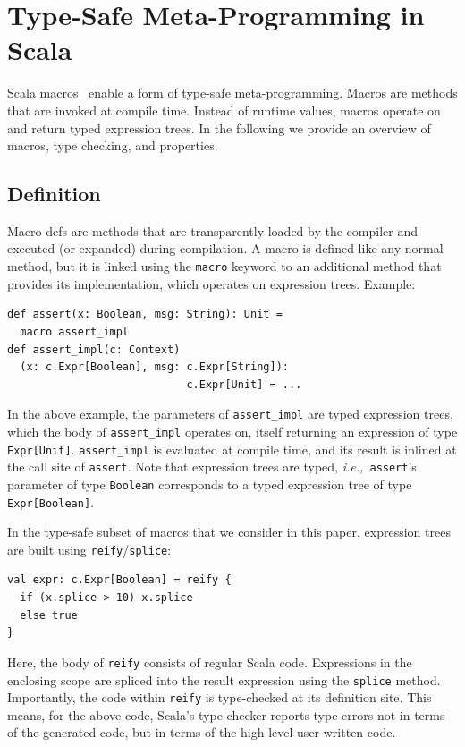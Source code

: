 \documentclass[preprint,nocopyrightspace]{sigplanconf}
\newcommand{\ie}{{\em i.e.,~}}
\begin{document}
\section{Type-Safe Meta-Programming in Scala}
\label{sec:macros}

Scala macros~\cite{Burmako2012, Burmako2013} enable a form of type-safe
meta-programming. Macros are methods that are invoked at compile time. Instead of
runtime values, macros operate on and return typed expression trees. In the
following we provide an overview of macros, type checking, and properties.

\subsection{Definition}

Macro defs are methods that are transparently loaded by
the compiler and executed (or expanded) during compilation. A macro is defined
like any normal method, but it is linked using the \verb|macro| keyword to an
additional method that provides its implementation, which operates on
expression trees. Example:
\begin{lstlisting}
def assert(x: Boolean, msg: String): Unit =
  macro assert_impl
def assert_impl(c: Context)
  (x: c.Expr[Boolean], msg: c.Expr[String]):
                            c.Expr[Unit] = ...
\end{lstlisting}
\noindent
In the above example, the parameters of \verb|assert_impl| are typed
expression trees, which the body of \verb|assert_impl| operates on, itself
returning an expression of type \verb|Expr[Unit]|. \verb|assert_impl|
is evaluated at compile time, and its result is inlined at
the call site of \verb|assert|.
Note that expression trees are typed, \ie \verb|assert|'s parameter of type
\verb|Boolean| corresponds to a typed expression tree of type
\verb|Expr[Boolean]|.

In the type-safe subset of macros that we consider in this paper,
expression trees are built using \verb|reify|/\verb|splice|:
\begin{lstlisting}
val expr: c.Expr[Boolean] = reify {
  if (x.splice > 10) x.splice
  else true
}
\end{lstlisting}
\noindent
Here, the body of \verb|reify| consists of regular Scala code. Expressions in
the enclosing scope are spliced into the result expression using the
\verb|splice| method. Importantly, the code within \verb|reify| is
type-checked at its definition site. This means, for the above code, Scala's type
checker reports type errors not in terms of the generated code, but in terms
of the high-level user-written code.
\end{document}
